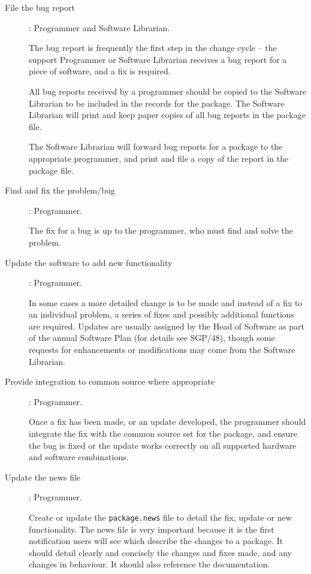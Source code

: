 \documentclass[twoside,11pt]{article}
\newcommand{\xref}[3]{#1}
\begin{document}
\begin{description}

\item[File the bug report]: Programmer and Software Librarian.

The bug report is frequently the first step in the change cycle -- the
support Programmer or Software Librarian receives a bug report for a
piece of software, and a fix is required.

All bug reports received by a programmer should be copied to the
Software Librarian to be included in the records for the package.  The
Software Librarian will print and keep paper copies of all bug reports
in the package file.

The Software Librarian will forward bug reports for a package to the
appropriate programmer, and print and file a copy of the report in the
package file.

\item[Find and fix the problem/bug]: Programmer.

The fix for a bug is up to the programmer, who must
find and solve the problem.  

\item[Update the software to add new functionality]: Programmer.

In some cases a more detailed change is to be made and instead of a fix
to an individual problem, a series of fixes and possibly additional functions 
are required.  Updates are usually assigned by the Head
of Software as part of the annual Software Plan (for details see
\xref{SGP/48}{sgp48}{}), though some requests for enhancements or
modifications may come from the Software Librarian.

\item[Provide integration to common source where appropriate]: Programmer.

Once a fix has been made, or an update developed, the programmer should
integrate the fix with the common source set for the package, and ensure
the bug is fixed or the update works correctly on all supported
hardware and software combinations.

\item[Update the news file]: Programmer.

Create or update the {\tt{package.news}} file to detail the fix, update
or new functionality.  The news file is very important because it is the
first notification users will see which describe the changes to a package.
It should detail clearly and concisely the changes and fixes made, and
any changes in behaviour.  It should also reference the documentation.


\end{description}
\end{document}

